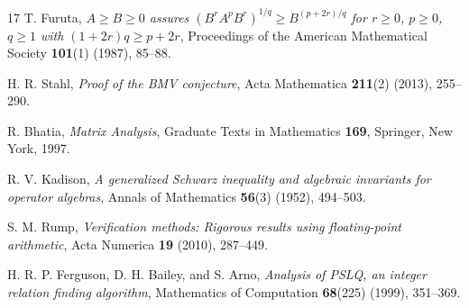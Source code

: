 \documentclass[10pt,letterpaper]{article}
\begin{document}
\begin{thebibliography}{17}
T. Furuta, \emph{$A \ge B \ge 0$ assures $(B^r A^p B^r)^{1/q} \ge B^{(p+2r)/q}$ for $r \ge 0$, $p \ge 0$, $q \ge 1$ with $(1+2r)q \ge p+2r$}, Proceedings of the American Mathematical Society \textbf{101}(1) (1987), 85--88.

H. R. Stahl, \emph{Proof of the BMV conjecture}, Acta Mathematica \textbf{211}(2) (2013), 255--290.

R. Bhatia, \emph{Matrix Analysis}, Graduate Texts in Mathematics \textbf{169}, Springer, New York, 1997.

R. V. Kadison, \emph{A generalized Schwarz inequality and algebraic invariants for operator algebras}, Annals of Mathematics \textbf{56}(3) (1952), 494--503.

S. M. Rump, \emph{Verification methods: Rigorous results using floating-point arithmetic}, Acta Numerica \textbf{19} (2010), 287--449.

H. R. P. Ferguson, D. H. Bailey, and S. Arno, \emph{Analysis of PSLQ, an integer relation finding algorithm}, Mathematics of Computation \textbf{68}(225) (1999), 351--369.
\end{thebibliography}
\end{document}
